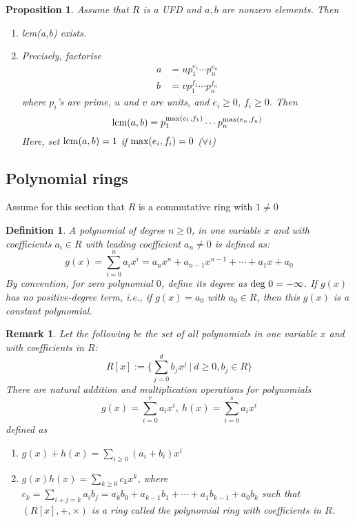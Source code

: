 \documentclass[a4paper,8pt]{article}
\newcommand{\hlt}[1]{\textit{{\color{blue}#1}}}
\newcommand{\maxs}[1]{\textnormal{max}#1}
\newcommand{\lcms}[1]{\textnormal{lcm}#1}
\newcommand{\degs}[1]{\textnormal{deg}#1}
\theoremstyle{theorem}
\newtheorem{proposition}[theorem]{Proposition}
\newtheorem{definition}[theorem]{Definition}
\newtheorem{remark}[theorem]{Remark}
\begin{document}
\begin{proposition}
Assume that $R$ is a UFD and $a,b$ are nonzero elements. Then
\begin{enumerate}[label=(\roman*)]
\item \lcms(a,b) exists.
\item Precisely, factorise
\begin{align}
a &= u p_1^{e_1} \cdots p_n^{e_n} \nonumber \\
b &= v p_1^{f_1} \cdots p_n^{f_n} \nonumber
\end{align}
where $p_i$'s are prime, $u$ and $v$ are units, and $e_i \geq 0$, $f_i \geq 0$. Then
\begin{equation}
\lcms(a,b) = p_1^{\maxs(e_1, f_1)} \cdots p_n^{\maxs(e_n, f_n)} \nonumber
\end{equation}
Here, set $\lcms(a,b) = 1$ if $\maxs(e_i, f_i) = 0$ ($\forall i$)
\end{enumerate}
\end{proposition}

\subsection{Polynomial rings}

Assume for this section that $R$ is a commutative ring with $1 \neq 0$
\begin{definition}
A \hlt{polynomial of degree $n \geq 0$, in one variable $x$ and with coefficients $a_i \in R$ with leading coefficient $a_n \neq 0$} is defined as:
\begin{equation}
g(x) = \sum_{i=0}^{n} a_i x^i = a_n x^n + a_{n-1} x^{n-1} + \cdots + a_1 x + a_0 \nonumber
\end{equation}
By convention, for zero polynomial $0$, define its degree as $\degs \ 0 = - \infty$.
If $g(x)$ has no positive-degree term, i.e., if $g(x) = a_0$ with $a_0 \in R$, then this $g(x)$ is a \hlt{constant polynomial}.
\end{definition}

\begin{remark}
Let the following be the set of all polynomials in one variable $x$ and with coefficients in $R$:
\begin{equation}
R[x] := \{\sum_{j=0}^{d} b_j x^j \ | \ d \geq 0, b_j \in R\} \nonumber
\end{equation}
There are natural addition and multiplication operations for polynomials
\begin{equation}
g(x) = \sum_{i=0}^{r} a_i x^i, \ h(x) = \sum_{i=0}^{s} a_i x^i \nonumber
\end{equation}
defined as
\begin{enumerate}[label=(\roman*)]
\item $g(x) + h(x) = \sum_{i \geq 0} (a_i + b_i)x^i$
\item $g(x)h(x) = \sum_{k \geq 0} c_k x^k$, where $c_k = \sum_{i+j = k} a_i b_j = a_k b_0 + a_{k-1} b_1 + \cdots + a_1 b_{k-1} + a_0 b_k$ such that $(R[x], +, \times)$ is a ring called the \hlt{polynomial ring with coefficients in $R$}.
\end{enumerate}
\end{remark}
\end{document}
